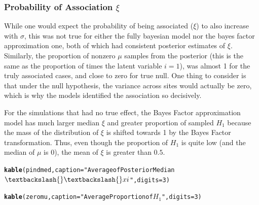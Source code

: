 \documentclass[AMA,STIX1COL]{WileyNJD-v2}\usepackage[]{graphicx}\usepackage[]{color}
\makeatletter
\newcommand{\hlnum}[1]{\textcolor[rgb]{0.686,0.059,0.569}{#1}}%
\newcommand{\hlstr}[1]{\textcolor[rgb]{0.192,0.494,0.8}{#1}}%
\newcommand{\hlstd}[1]{\textcolor[rgb]{0.345,0.345,0.345}{#1}}%
\newcommand{\hlkwc}[1]{\textcolor[rgb]{0.333,0.667,0.333}{#1}}%
\newcommand{\hlkwd}[1]{\textcolor[rgb]{0.737,0.353,0.396}{\textbf{#1}}}%
\newenvironment{kframe}{%
 \def\at@end@of@kframe{}%
 \ifinner\ifhmode%
  \def\at@end@of@kframe{\end{minipage}}%
  \begin{minipage}{\columnwidth}%
 \fi\fi%
 \def\FrameCommand##1{\hskip\@totalleftmargin \hskip-\fboxsep
 \colorbox{shadecolor}{##1}\hskip-\fboxsep
     \hskip-\linewidth \hskip-\@totalleftmargin \hskip\columnwidth}%
 \MakeFramed {\advance\hsize-\width
   \@totalleftmargin\z@ \linewidth\hsize
   \@setminipage}}%
 {\par\unskip\endMakeFramed%
 \at@end@of@kframe}
\newenvironment{knitrout}{}{} %
\makeatother
\begin{document}
\begin{figure}

\end{figure}

\subsubsection{Probability of Association $\xi$}

While one would expect the probability of being associated ($\xi$) to also increase with $\sigma$, this was not true for either the fully bayesian model nor the bayes factor approximation one, both of which had consistent posterior estimates of $\xi$. Similarly, the proportion of nonzero $\mu$ samples from the posterior (this is the same as the proportion of times the latent variable $i = 1$), was almost 1 for the truly associated cases, and close to zero for true null. One thing to consider is that under the null hypothesis, the variance across sites would actually be zero, which is why the models identified the association so decisively.

For the simulations that had no true effect, the Bayes Factor approximation model has much larger median $\xi$ and greater proportion of sampled $H_1$ because the mass of the distribution of $\xi$ is shifted towards 1 by the Bayes Factor transformation. Thus, even though the proportion of $H_1$ is quite low (and the median of $\mu$ is 0), the mean of $\xi$ is greater than $0.5$.


\begin{knitrout}
\color{fgcolor}\begin{kframe}
\begin{alltt}
\hlkwd{kable}\hlstd{(pindmed,}\hlkwc{caption}\hlstd{=}\hlstr{"Average of Posterior Median $\textbackslash{}\textbackslash{}xi$"}\hlstd{,} \hlkwc{digits}\hlstd{=}\hlnum{3}\hlstd{)}
\end{alltt}
\end{kframe}
\end{knitrout}

\begin{knitrout}
\color{fgcolor}\begin{kframe}
\begin{alltt}
\hlkwd{kable}\hlstd{(zeromu,}\hlkwc{caption}\hlstd{=}\hlstr{"Average Proportion of $H_1$"}\hlstd{,} \hlkwc{digits}\hlstd{=}\hlnum{3}\hlstd{)}
\end{alltt}
\end{kframe}
\end{knitrout}
\end{document}
